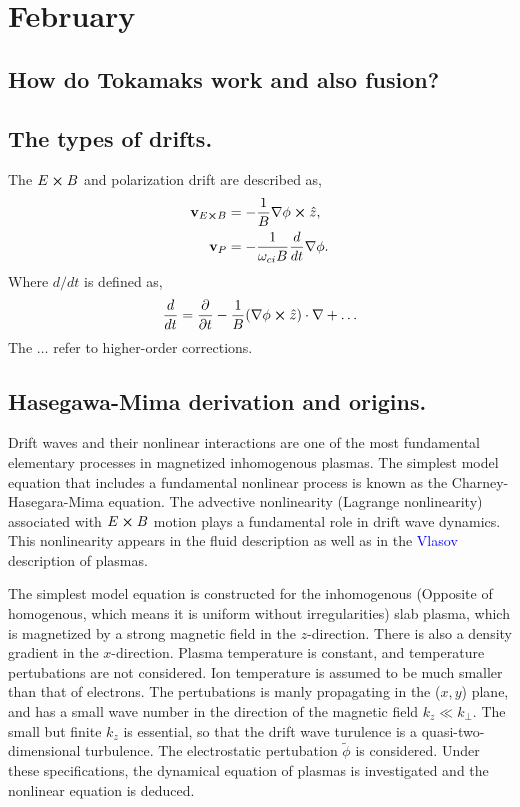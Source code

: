 \section{February}

\subsection{How do Tokamaks work and also fusion?}

\subsection{The types of drifts.}
The $E \cross B$ and polarization drift are described as, 
\begin{align}
	\bold{v}_{E \cross B} &= -\frac{1}{B} \nabla \phi \cross \hat{z}, \\
	\bold{v}_{P} &= - \frac{1}{\omega_{ci} B} \frac{d}{dt} \nabla \phi. 
\end{align}
Where $d/dt$ is defined as, 
\begin{align}
	\frac{d}{dt} = \frac{\partial}{\partial t} - \frac{1}{B} (\nabla \phi \cross \hat{z}) \cdot \nabla + \dots
\end{align}
The $\dots$ refer to higher-order corrections. 


\subsection{Hasegawa-Mima derivation and origins.}
Drift waves and their nonlinear interactions are one of the most fundamental elementary processes in magnetized inhomogenous plasmas. The simplest model equation that includes a fundamental nonlinear process is known as the Charney-Hasegara-Mima equation. The advective nonlinearity (Lagrange nonlinearity) associated with $E \cross B$ motion plays a fundamental role in drift wave dynamics. This nonlinearity appears in the fluid description as well as in the \textcolor{blue}{Vlasov} description of plasmas.

The simplest model equation is constructed for the inhomogenous (Opposite of homogenous, which means it is uniform without irregularities) slab plasma, which is magnetized by a strong magnetic field in the $z$-direction. There is also a density gradient in the $x$-direction. Plasma temperature is constant, and temperature pertubations are not considered. Ion temperature is assumed to be much smaller than that of electrons. The pertubations is manly propagating in the ($x,y$) plane, and has a small wave number in the direction of the magnetic field $k_z \ll k_{\perp}$. The small but finite $k_z$ is essential, so that the drift wave turulence is a quasi-two-dimensional turbulence. The electrostatic pertubation $\tilde{\phi}$ is considered. Under these specifications, the dynamical equation of plasmas is investigated and the nonlinear equation is deduced. 

